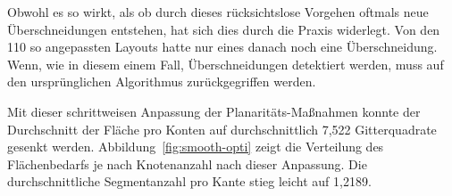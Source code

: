 \documentclass[a4paper]{scrreprt}
\theoremstyle{definition}
\begin{document}
Obwohl es so wirkt, als ob durch dieses rücksichtslose Vorgehen oftmals neue Überschneidungen entstehen, hat sich dies durch die Praxis widerlegt. Von den 110 so angepassten Layouts hatte nur eines danach noch eine Überschneidung. Wenn, wie in diesem einem Fall, Überschneidungen detektiert werden, muss auf den ursprünglichen Algorithmus zurückgegriffen werden.

Mit dieser schrittweisen Anpassung der Planaritäts-Maßnahmen konnte der Durchschnitt der Fläche pro Konten auf durchschnittlich 7,522 Gitterquadrate gesenkt werden. Abbildung~\ref{fig:smooth-opti} zeigt die Verteilung des Flächenbedarfs je nach Knotenanzahl nach dieser Anpassung. Die durchschnittliche Segmentanzahl pro Kante stieg leicht auf 1,2189.







\end{document}
